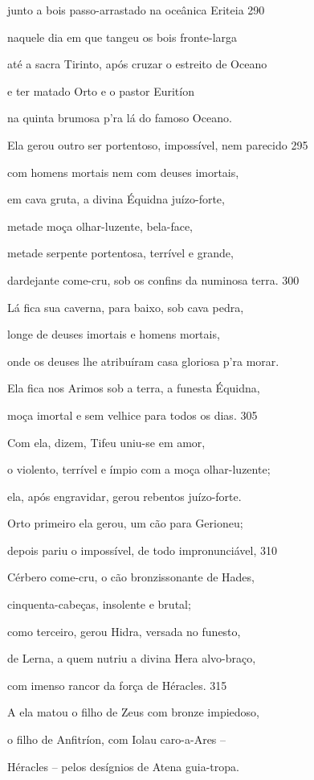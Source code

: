 junto a bois passo-arrastado na oceânica Eriteia \num{290}

naquele dia em que tangeu os bois fronte-larga

até a sacra Tirinto, após cruzar o estreito de Oceano

e ter matado Orto e o pastor Euritíon

na quinta brumosa p'ra lá do famoso Oceano.

\quad{}Ela gerou outro ser portentoso, impossível, nem parecido \num{295}

com homens mortais nem com deuses imortais,

em cava gruta, a divina Équidna juízo-forte,

metade moça olhar-luzente, bela-face,

metade serpente portentosa, terrível e grande,

dardejante come-cru, sob os confins da numinosa terra. \num{300}

Lá fica sua caverna, para baixo, sob cava pedra,

longe de deuses imortais e homens mortais,

onde os deuses lhe atribuíram casa gloriosa p'ra morar.

\quad{}Ela fica nos Arimos sob a terra, a funesta Équidna,

moça imortal e sem velhice para todos os dias. \num{305}

Com ela, dizem, Tifeu uniu-se em amor,

o violento, terrível e ímpio com a moça olhar-luzente;

ela, após engravidar, gerou rebentos juízo-forte.

Orto primeiro ela gerou, um cão para Gerioneu;

depois pariu o impossível, de todo impronunciável, \num{310}

Cérbero come-cru, o cão bronzissonante de Hades,

cinquenta-cabeças, insolente e brutal;

como terceiro, gerou Hidra, versada no funesto,

de Lerna, a quem nutriu a divina Hera alvo-braço,

com imenso rancor da força de Héracles. \num{315}

A ela matou o filho de Zeus com bronze impiedoso,

o filho de Anfitríon, com Iolau caro-a-Ares --

Héracles -- pelos desígnios de Atena guia-tropa.

